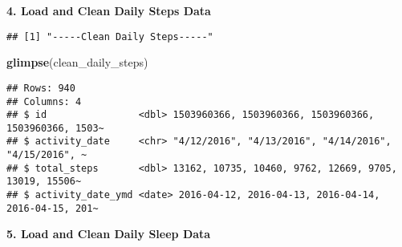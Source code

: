 \documentclass[
]{article}
\newenvironment{Shaded}{\begin{snugshade}}{\end{snugshade}}
\newcommand{\AttributeTok}[1]{\textcolor[rgb]{0.13,0.29,0.53}{#1}}
\newcommand{\CommentTok}[1]{\textcolor[rgb]{0.56,0.35,0.01}{\textit{#1}}}
\newcommand{\FunctionTok}[1]{\textcolor[rgb]{0.13,0.29,0.53}{\textbf{#1}}}
\newcommand{\NormalTok}[1]{#1}
\newcommand{\OtherTok}[1]{\textcolor[rgb]{0.56,0.35,0.01}{#1}}
\newcommand{\SpecialCharTok}[1]{\textcolor[rgb]{0.81,0.36,0.00}{\textbf{#1}}}
\newcommand{\StringTok}[1]{\textcolor[rgb]{0.31,0.60,0.02}{#1}}
\begin{document}
\textbf{4. Load and Clean Daily Steps Data}

\begin{Shaded}
\end{Shaded}

\begin{verbatim}
## [1] "-----Clean Daily Steps-----"
\end{verbatim}

\begin{Shaded}
\begin{Highlighting}[]
\FunctionTok{glimpse}\NormalTok{(clean\_daily\_steps)}
\end{Highlighting}
\end{Shaded}

\begin{verbatim}
## Rows: 940
## Columns: 4
## $ id                <dbl> 1503960366, 1503960366, 1503960366, 1503960366, 1503~
## $ activity_date     <chr> "4/12/2016", "4/13/2016", "4/14/2016", "4/15/2016", ~
## $ total_steps       <dbl> 13162, 10735, 10460, 9762, 12669, 9705, 13019, 15506~
## $ activity_date_ymd <date> 2016-04-12, 2016-04-13, 2016-04-14, 2016-04-15, 201~
\end{verbatim}

\textbf{5. Load and Clean Daily Sleep Data}
\end{document}
